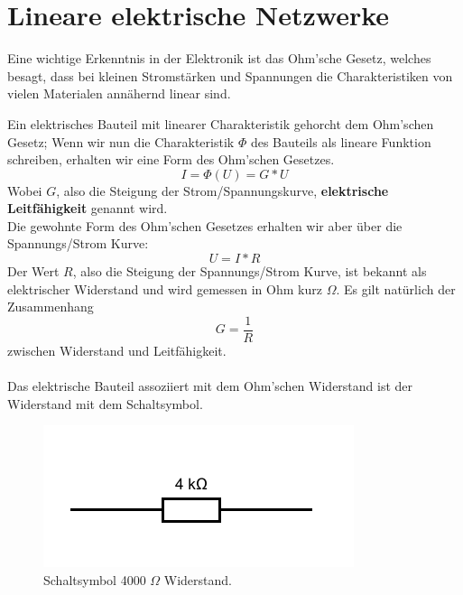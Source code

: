 \documentclass[11pt,a4paper,leqno]{report}
\numberwithin{equation}{chapter}
\begin{document}
\section{Lineare elektrische Netzwerke}
Eine wichtige Erkenntnis in der Elektronik ist das Ohm'sche Gesetz, welches besagt, dass bei kleinen Stromst\"arken und Spannungen die Charakteristiken von vielen Materialen ann\"ahernd linear sind.
\begin{figure}[H]
\end{figure}
\noindent
Ein elektrisches Bauteil mit linearer Charakteristik gehorcht dem Ohm'schen Gesetz; Wenn wir nun die Charakteristik $\Phi$ des Bauteils als lineare Funktion schreiben, erhalten wir eine Form des Ohm'schen Gesetzes.
\begin{equation}
I = \Phi(U) = G * U
\end{equation}
Wobei $G$, also die Steigung der Strom/Spannungskurve, \textbf{elektrische Leitf\"ahigkeit} genannt wird.\\
Die gewohnte Form des Ohm'schen Gesetzes erhalten wir aber \"uber die  Spannungs/Strom Kurve:
\begin{equation}
U = I * R
\end{equation}
\noindent
Der Wert $R$, also die Steigung der Spannungs/Strom Kurve, ist bekannt als elektrischer Widerstand und wird gemessen in Ohm kurz $\Omega$.
Es gilt nat\"urlich der Zusammenhang
\begin{equation}
G = \frac{1}{R}
\end{equation}
zwischen Widerstand und Leitf\"ahigkeit.
\\
\\
Das elektrische Bauteil assoziiert mit dem Ohm'schen Widerstand ist der Widerstand mit dem Schaltsymbol.
\begin{figure}[H]
	\begin{center}
		\includegraphics[scale=1]{widder.pdf}
		\caption{Schaltsymbol 4000 $\Omega$ Widerstand.}
	\end{center}
\end{figure}
\end{document}
